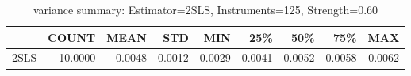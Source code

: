 \begin{table}[ht]
\centering
\caption{variance summary: Estimator=2SLS, Instruments=125, Strength=0.60}
\begin{tabular}{lrrrrrrrr}
\toprule
 & COUNT & MEAN & STD & MIN & 25\% & 50\% & 75\% & MAX \\
\midrule
2SLS & 10.0000 & 0.0048 & 0.0012 & 0.0029 & 0.0041 & 0.0052 & 0.0058 & 0.0062 \\
\bottomrule
\end{tabular}
\end{table}
